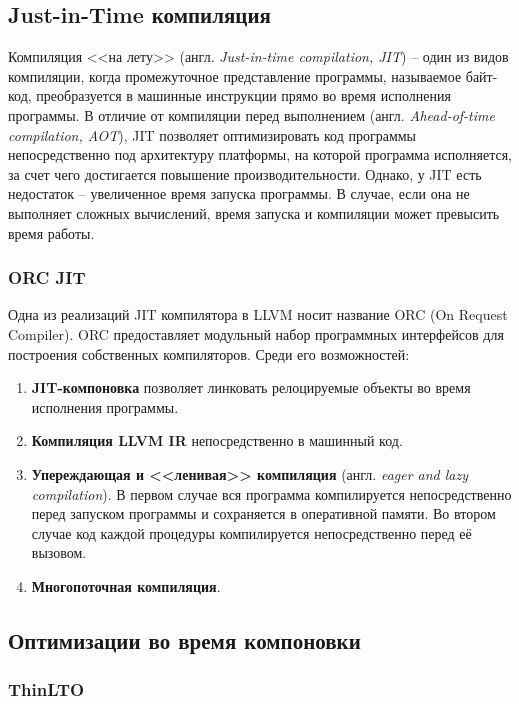 \subsection{Just-in-Time компиляция}
Компиляция <<на лету>> (англ. \textit{Just-in-time compilation, JIT}) --
один из видов компиляции, когда промежуточное представление программы, 
называемое байт-код, преобразуется в машинные инструкции прямо во время
исполнения программы. В отличие от компиляции перед выполнением (англ. 
\textit{Ahead-of-time compilation, AOT}), JIT позволяет оптимизировать код
программы непосредственно под архитектуру платформы, на которой программа
исполняется, за счет чего достигается повышение производительности. Однако, у
JIT есть недостаток -- увеличенное время запуска программы. В случае, если она
не выполняет сложных вычислений, время запуска и компиляции может превысить 
время работы.
\subsubsection{ORC JIT}
Одна из реализаций JIT компилятора в LLVM носит название ORC (On Request 
Compiler). ORC предоставляет модульный набор программных интерфейсов для 
построения собственных компиляторов. Среди его возможностей:
\begin{enumerate}
\item \textbf{JIT-компоновка} позволяет линковать релоцируемые объекты во время
исполнения программы.
\item \textbf{Компиляция LLVM IR} непосредственно в машинный код.
\item \textbf{Упереждающая и <<ленивая>> компиляция} (англ. \textit{eager and
lazy compilation}). В первом случае вся программа компилируется непосредственно
перед запуском программы и сохраняется в оперативной памяти. Во втором случае
код каждой процедуры компилируется непосредственно перед её вызовом.
\item \textbf{Многопоточная компиляция}.
\end{enumerate}

\subsection{Оптимизации во время компоновки}
\subsubsection{ThinLTO}

